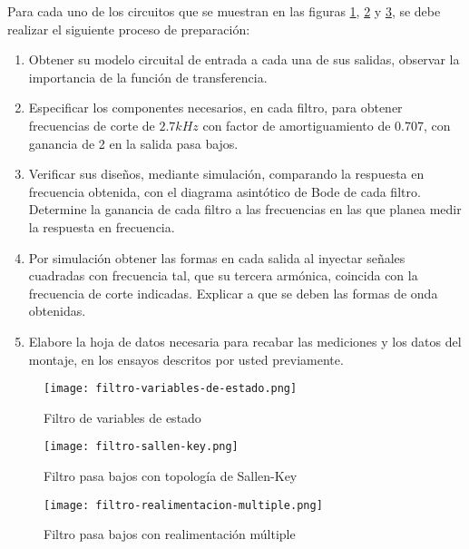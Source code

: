 Para cada uno de los circuitos que se muestran en las figuras \ref{fig:filtro-variables-de-estado}, \ref{fig:filtro-sallen-key} y \ref{fig:filtro-realimentacion-multiple}, se debe realizar el siguiente proceso de preparación:

\begin{enumerate}
    \item Obtener su modelo circuital de entrada a cada una de sus salidas, observar la importancia de la función de transferencia.
    \item Especificar los componentes necesarios, en cada filtro, para obtener frecuencias de corte de $2.7 kHz$ con factor de amortiguamiento de 0.707, con ganancia de 2 en la salida pasa bajos.
    \item Verificar sus diseños, mediante simulación, comparando la respuesta en frecuencia obtenida, con el diagrama asintótico de Bode de cada filtro. Determine la ganancia de cada filtro a las frecuencias en las que planea medir la respuesta en frecuencia.
    \item Por simulación obtener las formas en cada salida al inyectar señales cuadradas con frecuencia tal, que su tercera armónica, coincida con la frecuencia de corte indicadas. Explicar a que se deben las formas de onda obtenidas.
    \item Elabore la hoja de datos necesaria para recabar las mediciones y los datos del montaje, en los ensayos descritos por usted previamente.
\end{enumerate}

\begin{figure}[ht]
    \centering
    \texttt{[image: filtro-variables-de-estado.png]}
    \caption{Filtro de variables de estado}
    \label{fig:filtro-variables-de-estado}
\end{figure}

\begin{figure}[ht]
    \centering
    \texttt{[image: filtro-sallen-key.png]}
    \caption{Filtro pasa bajos con topología de Sallen-Key}
    \label{fig:filtro-sallen-key}
\end{figure}

\begin{figure}[ht]
    \centering
    \texttt{[image: filtro-realimentacion-multiple.png]}
    \caption{Filtro pasa bajos con realimentación múltiple}
    \label{fig:filtro-realimentacion-multiple}
\end{figure}

